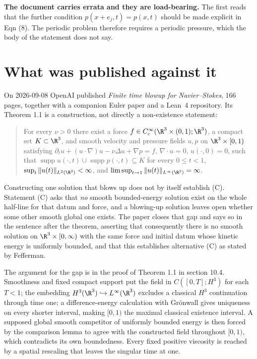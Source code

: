 \textbf{The document carries errata and they are load-bearing.} The first reads that the further
condition $p(x+e_j,t)=p(x,t)$ should be made explicit in Eqn (8). The periodic problem therefore
requires a periodic pressure, which the body of the statement does not say.

\section{What was published against it}

On 2026-09-08 OpenAI published \emph{Finite time blowup for Navier--Stokes}, 166 pages, together
with a companion Euler paper and a Lean~4 repository. Its Theorem 1.1 is a construction, not
directly a non-existence statement:

\begin{quote}
For every $\nu>0$ there exist a force $f \in C_c^\infty(\R^3\times(0,1);\R^3)$, a compact set
$K\subset\R^3$, and smooth velocity and pressure fields $u,p$ on $\R^3\times[0,1)$ satisfying
$\partial_t u + (u\cdot\nabla)u - \nu\Delta u + \nabla p = f$, $\nabla\cdot u = 0$,
$u(\cdot,0)=0$, such that $\operatorname{supp} u(\cdot,t)\cup\operatorname{supp}p(\cdot,t)\subseteq
K$ for every $0\le t<1$, $\sup_t \|u(t)\|_{L^2(\R^3)} < \infty$, and
$\limsup_{t\to1}\|u(t)\|_{L^\infty(\R^3)} = \infty$.
\end{quote}

Constructing one solution that blows up does not by itself establish (C). Statement (C) asks that
\emph{no} smooth bounded-energy solution exist on the whole half-line for that datum and force, and
a blowing-up solution leaves open whether some other smooth global one exists. The paper closes
that gap and says so in the sentence after the theorem, asserting that consequently there is no
smooth solution on $\R^3\times[0,\infty)$ with the same force and initial datum whose kinetic
energy is uniformly bounded, and that this establishes alternative (C) as stated by Fefferman.

The argument for the gap is in the proof of Theorem 1.1 in section 10.4. Smoothness and fixed
compact support put the field in $C([0,T];H^3)$ for each $T<1$; the embedding
$H^3(\R^3)\hookrightarrow L^\infty(\R^3)$ excludes a classical $H^3$ continuation through time one;
a difference-energy calculation with Gr\"onwall gives uniqueness on every shorter interval, making
$[0,1)$ the maximal classical existence interval. A supposed global smooth competitor of uniformly
bounded energy is then forced by the comparison lemma to agree with the constructed field
throughout $[0,1)$, which contradicts its own boundedness. Every fixed positive viscosity is
reached by a spatial rescaling that leaves the singular time at one.

